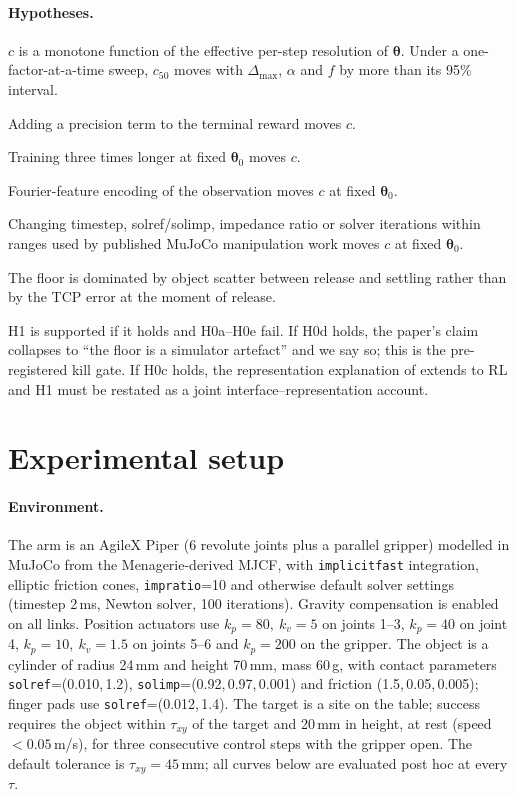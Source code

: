 \documentclass{article}
\newcommand{\dmax}{\Delta_{\max}}
\newcommand{\iface}{\boldsymbol{\theta}}
\begin{document}
\paragraph{Hypotheses.}
\begin{description}[nosep,leftmargin=1.5em]
\item[H1 (interface).] $c$ is a monotone function of the effective per-step resolution of $\iface$. Under a one-factor-at-a-time sweep, $c_{50}$ moves with $\dmax$, $\alpha$ and $f$ by more than its 95\% interval.
\item[H0a (reward).] Adding a precision term to the terminal reward moves $c$.
\item[H0b (budget).] Training three times longer at fixed $\iface_0$ moves $c$.
\item[H0c (representation).] Fourier-feature encoding of the observation moves $c$ at fixed $\iface_0$.
\item[H0d (simulator).] Changing timestep, solref/solimp, impedance ratio or solver iterations within ranges used by published MuJoCo manipulation work moves $c$ at fixed $\iface_0$.
\item[H0e (release physics).] The floor is dominated by object scatter between release and settling rather than by the TCP error at the moment of release.
\end{description}
H1 is supported if it holds and H0a--H0e fail. If H0d holds, the paper's claim collapses to ``the floor is a simulator artefact'' and we say so; this is the pre-registered kill gate. If H0c holds, the representation explanation of \citet{gyenes2026fourier} extends to RL and H1 must be restated as a joint interface--representation account.

\section{Experimental setup}
\label{sec:setup}

\paragraph{Environment.}
The arm is an AgileX Piper (6 revolute joints plus a parallel gripper) modelled in MuJoCo \citep{todorov2012mujoco} from the Menagerie-derived MJCF, with \texttt{implicitfast} integration, elliptic friction cones, \texttt{impratio}=10 and otherwise default solver settings (timestep 2\,ms, Newton solver, 100 iterations). Gravity compensation is enabled on all links. Position actuators use $k_p{=}80,\ k_v{=}5$ on joints 1--3, $k_p{=}40$ on joint 4, $k_p{=}10,\ k_v{=}1.5$ on joints 5--6 and $k_p{=}200$ on the gripper. The object is a cylinder of radius 24\,mm and height 70\,mm, mass 60\,g, with contact parameters \texttt{solref}=(0.010,\,1.2), \texttt{solimp}=(0.92,\,0.97,\,0.001) and friction (1.5,\,0.05,\,0.005); finger pads use \texttt{solref}=(0.012,\,1.4). The target is a site on the table; success requires the object within $\tau_{xy}$ of the target and 20\,mm in height, at rest (speed $<0.05$\,m/s), for three consecutive control steps with the gripper open. The default tolerance is $\tau_{xy}{=}45$\,mm; all curves below are evaluated post hoc at every $\tau$.
\end{document}
